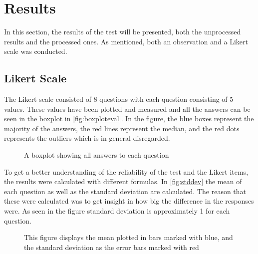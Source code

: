 \section{Results}
In this section, the results of the test will be presented, both the unprocessed results and the processed ones. As mentioned, both an observation and a Likert scale was conducted. 

\subsection{Likert Scale}
The Likert scale consisted of 8 questions with each question consisting of 5 values. These values have been plotted and measured and all the answers can be seen in the boxplot in \autoref{fig:boxploteval}. In the figure, the blue boxes represent the majority of the answers, the red lines represent the median, and the red dots represents the outliers which is in general disregarded. 

\begin{figure}[H]
	
	\centering
	\caption{A boxplot showing all answers to each question}
	\label{fig:boxploteval}
\end{figure}

To get a better understanding of the reliability of the test and the Likert items, the results were calculated with different formulas. In \autoref{fig:stddev} the mean of each question as well as the standard deviation are calculated. The reason that these were calculated was to get insight in how big the difference in the responses were. As seen in the figure standard deviation
is approximately 1 for each question.
\begin{figure}[H]
	
	\centering
	\caption{This figure displays the mean plotted in bars marked with blue, and the standard deviation as the error bars marked with red}
	\label{fig:stddev}
\end{figure}

